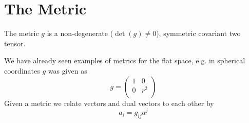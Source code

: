 \section{The Metric}
\begin{definition}[Metric]
The metric $g$ is a non-degenerate ($\det(g)\neq 0$), symmetric covariant two
tensor.
\end{definition}
We have already seen examples of metrics for the flat space, e.g. in spherical coordinates $g$ was given as
\begin{equation}
    g=
    \begin{pmatrix}
        1 & 0\\
        0 & r^2\\
    \end{pmatrix}
\end{equation}
Given a metric we relate vectors and dual vectors to each other by
\begin{equation}
    a_i=g_{ij}a^j
\end{equation}
